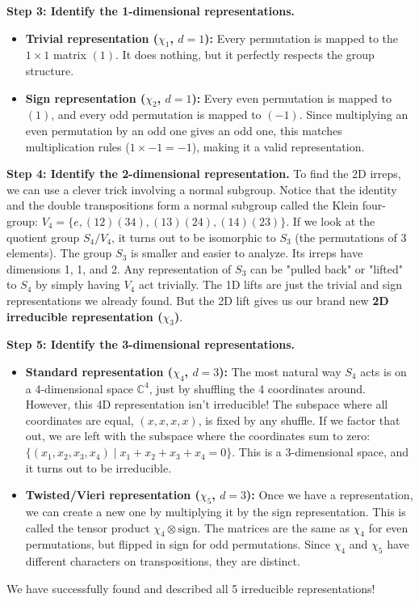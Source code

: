 \begin{solution}
\textbf{Step 3: Identify the 1-dimensional representations.}
\begin{itemize}
    \item \textbf{Trivial representation ($\chi_1$, $d=1$):} Every permutation is mapped to the $1 \times 1$ matrix $(1)$. It does nothing, but it perfectly respects the group structure.
    \item \textbf{Sign representation ($\chi_2$, $d=1$):} Every even permutation is mapped to $(1)$, and every odd permutation is mapped to $(-1)$. Since multiplying an even permutation by an odd one gives an odd one, this matches multiplication rules ($1 \times -1 = -1$), making it a valid representation.
\end{itemize}

\textbf{Step 4: Identify the 2-dimensional representation.}
To find the 2D irreps, we can use a clever trick involving a normal subgroup.
Notice that the identity and the double transpositions form a normal subgroup called the Klein four-group: $V_4 = \{e, (12)(34), (13)(24), (14)(23)\}$.
If we look at the quotient group $S_4/V_4$, it turns out to be isomorphic to $S_3$ (the permutations of 3 elements).
The group $S_3$ is smaller and easier to analyze. Its irreps have dimensions 1, 1, and 2. Any representation of $S_3$ can be "pulled back" or "lifted" to $S_4$ by simply having $V_4$ act trivially.
The 1D lifts are just the trivial and sign representations we already found. But the 2D lift gives us our brand new \textbf{2D irreducible representation ($\chi_3$)}.

\textbf{Step 5: Identify the 3-dimensional representations.}
\begin{itemize}
    \item \textbf{Standard representation ($\chi_4$, $d=3$):} The most natural way $S_4$ acts is on a 4-dimensional space $\mathbb{C}^4$, just by shuffling the 4 coordinates around. However, this 4D representation isn't irreducible! The subspace where all coordinates are equal, $(x, x, x, x)$, is fixed by any shuffle.
    If we factor that out, we are left with the subspace where the coordinates sum to zero: $\{(x_1, x_2, x_3, x_4) \mid x_1 + x_2 + x_3 + x_4 = 0\}$. This is a 3-dimensional space, and it turns out to be irreducible.
    \item \textbf{Twisted/Vieri representation ($\chi_5$, $d=3$):} Once we have a representation, we can create a new one by multiplying it by the sign representation. This is called the tensor product $\chi_4 \otimes \text{sign}$. The matrices are the same as $\chi_4$ for even permutations, but flipped in sign for odd permutations. Since $\chi_4$ and $\chi_5$ have different characters on transpositions, they are distinct.
\end{itemize}
We have successfully found and described all 5 irreducible representations!
\end{solution}

